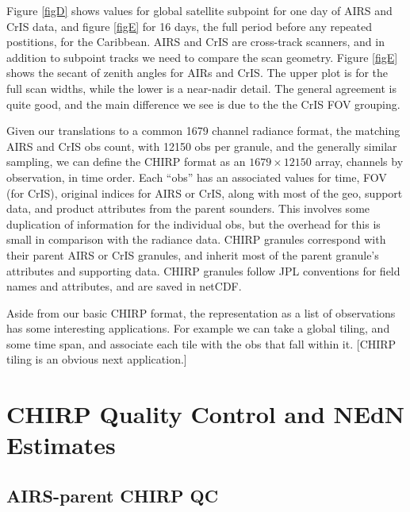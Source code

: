 \documentclass[12pt]{article}
\begin{document}
Figure \ref{figD} shows values for global satellite subpoint for
one day of AIRS and CrIS data, and figure \ref{figE} for 16 days,
the full period before any repeated postitions, for the Caribbean.
AIRS and CrIS are cross-track scanners, and in addition to subpoint
tracks we need to compare the scan geometry.  Figure \ref{figE}
shows the secant of zenith angles for AIRs and CrIS.  The upper plot
is for the full scan widths, while the lower is a near-nadir detail.
The general agreement is quite good, and the main difference we see
is due to the the CrIS FOV grouping.

Given our translations to a common 1679 channel radiance format,
the matching AIRS and CrIS obs count, with 12150 obs per granule,
and the generally similar sampling, we can define the CHIRP format
as an $1679 \times 12150$ array, channels by observation, in time
order.  Each ``obs'' has an associated values for time, FOV (for
CrIS), original indices for AIRS or CrIS, along with most of the
geo, support data, and product attributes from the parent sounders.
This involves some duplication of information for the individual
obs, but the overhead for this is small in comparison with the
radiance data.  CHIRP granules correspond with their parent AIRS or
CrIS granules, and inherit most of the parent granule's attributes
and supporting data.  CHIRP granules follow JPL conventions for
field names and attributes, and are saved in netCDF.

Aside from our basic CHIRP format, the representation as a list of
observations has some interesting applications.  For example we can
take a global tiling, and some time span, and associate each tile
with the obs that fall within it.  [CHIRP tiling is an obvious next
application.]

\section{CHIRP Quality Control and NEdN Estimates}

\subsection{AIRS-parent CHIRP QC}
\end{document}
